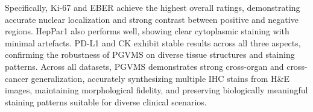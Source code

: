 \documentclass[journal,twoside,web]{ieeecolor}
\begin{document}
{
Specifically, Ki-67 and EBER achieve the highest overall ratings, demonstrating accurate nuclear localization and strong contrast between positive and negative regions. 
HepPar1 also performs well, showing clear cytoplasmic staining with minimal artefacts. 
PD-L1 and CK exhibit stable results across all three aspects, confirming the robustness of PGVMS on diverse tissue structures and staining patterns. 
Across all datasets, PGVMS demonstrates strong cross-organ and cross-cancer generalization, accurately synthesizing multiple IHC stains from H\&E images, maintaining morphological fidelity, and preserving biologically meaningful staining patterns suitable for diverse clinical scenarios.
}


\end{document}
